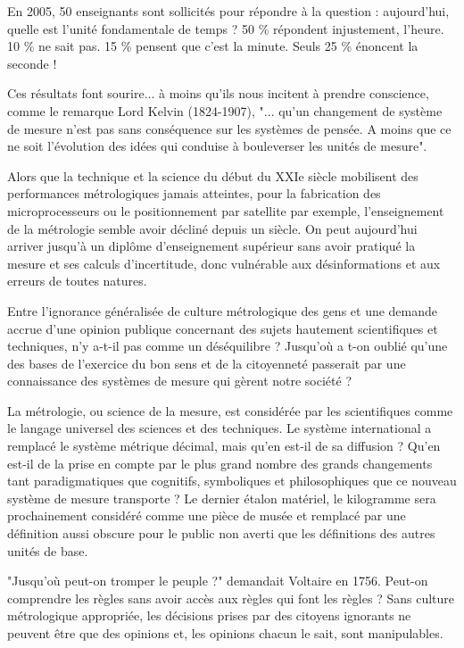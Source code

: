 \documentclass[main.tex]{subfiles}
\begin{document}
En 2005, 50 enseignants sont sollicités pour répondre à la question : aujourd'hui, quelle est l'unité fondamentale de temps ?   50 \% répondent injustement, l'heure.  10 \% ne sait pas.  15 \% pensent que c'est la minute.  Seuls 25 \% énoncent la seconde !

Ces résultats font sourire... à moins qu'ils nous incitent à prendre conscience, comme le remarque Lord Kelvin (1824-1907), "... qu'un changement de système de mesure n'est pas sans conséquence sur les systèmes de pensée. A moins que ce ne soit l'évolution des idées qui conduise à bouleverser les unités de mesure".
 
Alors que la technique et la science du début du XXIe siècle mobilisent des performances métrologiques jamais atteintes, pour la fabrication des microprocesseurs ou le positionnement par satellite par exemple, l'enseignement de la métrologie semble avoir décliné depuis un siècle. On peut aujourd'hui arriver jusqu'à un diplôme d'enseignement supérieur sans avoir pratiqué la mesure et ses calculs d'incertitude, donc vulnérable aux désinformations et aux erreurs de toutes natures.

Entre l'ignorance généralisée de culture métrologique des gens et une demande accrue d'une opinion publique concernant des sujets hautement scientifiques et techniques, n'y a-t-il pas comme un déséquilibre ? Jusqu'où a t-on oublié qu'une des bases de l'exercice du bon sens et de la citoyenneté passerait par une connaissance des systèmes de mesure qui gèrent notre société ?

La métrologie, ou science de la mesure, est considérée par les scientifiques comme le langage universel des sciences et des techniques.  Le système international a remplacé le système métrique décimal, mais qu'en est-il de sa diffusion ?  Qu'en est-il de la prise en compte par le plus grand nombre des grands changements tant paradigmatiques que cognitifs, symboliques et philosophiques que ce nouveau système de mesure transporte ?  Le dernier étalon matériel, le kilogramme sera prochainement considéré comme une pièce de musée et remplacé par une définition aussi obscure pour le public non averti que les définitions des autres unités de base.

"Jusqu'où peut-on tromper le peuple ?" demandait Voltaire en 1756.  Peut-on comprendre les règles sans avoir accès aux règles qui font les règles ?  Sans culture métrologique appropriée, les décisions prises par des citoyens ignorants ne peuvent être que des opinions et, les opinions chacun le sait, sont manipulables.
\end{document}
